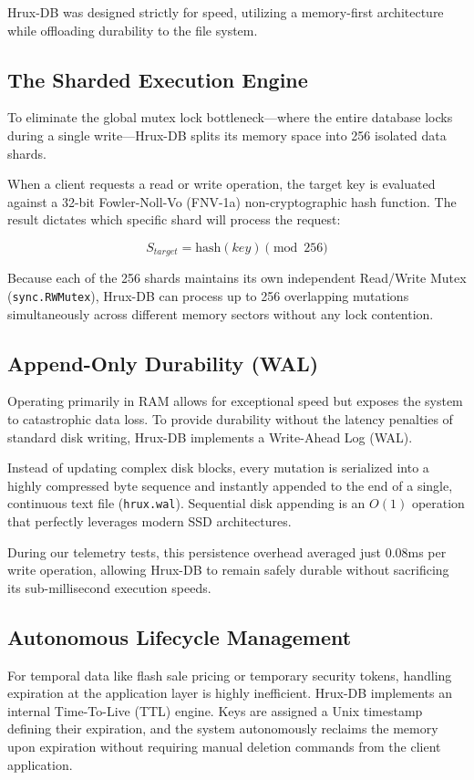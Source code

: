 \documentclass[10pt,twocolumn,letterpaper]{article}
\begin{document}
Hrux-DB was designed strictly for speed, utilizing a memory-first architecture while offloading durability to the file system.

\subsection{The Sharded Execution Engine}
To eliminate the global mutex lock bottleneck—where the entire database locks during a single write—Hrux-DB splits its memory space into 256 isolated data shards.

When a client requests a read or write operation, the target key is evaluated against a 32-bit Fowler-Noll-Vo (FNV-1a) non-cryptographic hash function. The result dictates which specific shard will process the request:

\begin{equation}
S_{target} = \text{hash}(key) \pmod{256}
\end{equation}

Because each of the 256 shards maintains its own independent Read/Write Mutex (\texttt{sync.RWMutex}), Hrux-DB can process up to 256 overlapping mutations simultaneously across different memory sectors without any lock contention. 

\subsection{Append-Only Durability (WAL)}
Operating primarily in RAM allows for exceptional speed but exposes the system to catastrophic data loss. To provide durability without the latency penalties of standard disk writing, Hrux-DB implements a Write-Ahead Log (WAL).

Instead of updating complex disk blocks, every mutation is serialized into a highly compressed byte sequence and instantly appended to the end of a single, continuous text file (\texttt{hrux.wal}). Sequential disk appending is an $O(1)$ operation that perfectly leverages modern SSD architectures. 

During our telemetry tests, this persistence overhead averaged just 0.08ms per write operation, allowing Hrux-DB to remain safely durable without sacrificing its sub-millisecond execution speeds.

\subsection{Autonomous Lifecycle Management}
For temporal data like flash sale pricing or temporary security tokens, handling expiration at the application layer is highly inefficient. Hrux-DB implements an internal Time-To-Live (TTL) engine. Keys are assigned a Unix timestamp defining their expiration, and the system autonomously reclaims the memory upon expiration without requiring manual deletion commands from the client application.
\end{document}
